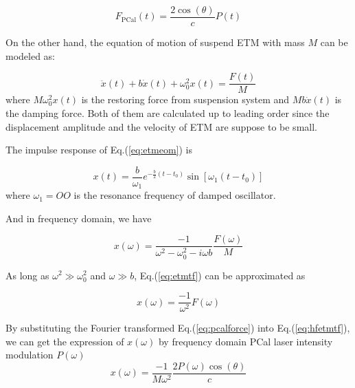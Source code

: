 \begin{equation}
\label{eq:pcalforce}
    F_\text{PCal}(t) = \frac{ 2 \cos(\theta) }{c} P(t) 
\end{equation}


On the other hand, the equation of motion of suspend ETM with mass $M$ can be modeled as:

\begin{equation}
\label{eq:etmeom}
    \ddot{x}(t) + b \dot{x}(t) + \omega_0^2 x(t) = \frac{F(t)}{M} 
\end{equation}
where $M \omega_0^2 x(t)$ is the restoring force from suspension system and $M b\dot{x}(t)$ is the damping force. Both of them are calculated up to leading order since the displacement amplitude and the velocity of ETM are suppose to be small. 


%


The impulse response of Eq.(\ref{eq:etmeom}) is

\begin{equation}
    x(t)=\frac{b}{\omega_1}e^{-\frac{b}{2}(t-t_0)}\sin[\omega_1 (t-t_0)]
\end{equation}
where $\omega_1 = OO$ is the resonance frequency of damped oscillator.


And in frequency domain, we have

\begin{equation}
\label{eq:etmtf}
   x(\omega)=\frac{-1}{\omega^2 - \omega_0^2 - i \omega b} \frac{F(\omega)}{M}
\end{equation}

As long as $\omega^2 \gg \omega_0^2$ and $\omega \gg b$, Eq.(\ref{eq:etmtf}) can be approximated as

\begin{equation}
\label{eq:hfetmtf}
   x(\omega)=\frac{-1}{\omega^2}F(\omega)
\end{equation}

By substituting the Fourier transformed Eq.({\ref{eq:pcalforce}}) into Eq.({\ref{eq:hfetmtf}}), we can get the expression of $x(\omega)$ by frequency domain PCal laser intensity modulation $P(\omega)$
\begin{equation}
\label{eq:pcaldisp}
    x(\omega) = \frac{-1}{M \omega^2} \frac{2  P(\omega) \cos(\theta)}{c} 
\end{equation}



